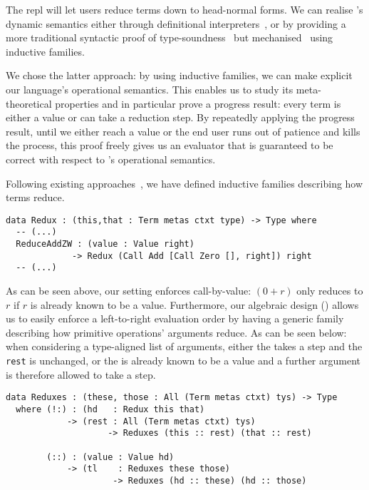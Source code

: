 The \Velo{} \acs*{repl} will let users reduce terms down to head-normal forms.
%
We can realise \Velo{}'s dynamic semantics either through definitional
interpreters~\cite{10.1145/3093333.3009866,Augustsson1999edt},
or by providing a more traditional syntactic proof of
type-soundness~\cite{DBLP:journals/iandc/WrightF94}
but mechanised~\cite[Part 2: Properties]{plfa22.08} using inductive families.

We chose the latter approach: by using inductive families, we can make explicit
our language's operational semantics.
%
This enables us to study its meta-theoretical properties and in particular prove
a progress result: every term is either a value or can take a reduction step.
%
By repeatedly applying the progress result, until we either reach a value or the end
user runs out of patience and kills the process, this proof freely gives us an
evaluator that is guaranteed to be correct with respect to \Velo{}'s operational
semantics.

Following existing approaches~\cite[Part 2: Properties]{plfa22.08}, we have defined
inductive families describing how terms reduce.

\begin{Verbatim}
data Redux : (this,that : Term metas ctxt type) -> Type where
  -- (...)
  ReduceAddZW : (value : Value right)
             -> Redux (Call Add [Call Zero [], right]) right
  -- (...)
\end{Verbatim}

As can be seen above, our setting enforces call-by-value: $(0 + r)$
only reduces to $r$ if $r$ is already known to be a value.
%
Furthermore, our algebraic design () allows
us to easily enforce a left-to-right evaluation order by having a generic
family describing how primitive operations' arguments reduce.
%
As can be seen below: when considering a type-aligned list of arguments,
either the  takes a step and the \texttt{rest} is unchanged,
or the  is already known to be a value and a further argument
is therefore allowed to take a step.

\begin{Verbatim}
data Reduxes : (these, those : All (Term metas ctxt) tys) -> Type
  where (!:) : (hd   : Redux this that)
            -> (rest : All (Term metas ctxt) tys)
                    -> Reduxes (this :: rest) (that :: rest)

        (::) : (value : Value hd)
            -> (tl    : Reduxes these those)
                     -> Reduxes (hd :: these) (hd :: those)
\end{Verbatim}


